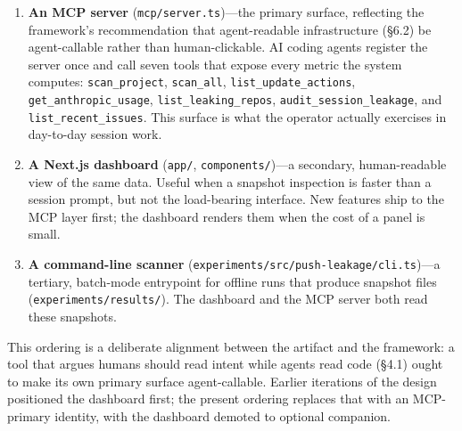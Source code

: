 \documentclass[12pt]{article}
\begin{document}
\begin{enumerate}
  \item \textbf{An MCP server} (\texttt{mcp/server.ts})---the primary surface, reflecting the framework's recommendation that agent-readable infrastructure (\S6.2) be agent-callable rather than human-clickable. AI coding agents register the server once and call seven tools that expose every metric the system computes: \texttt{scan\_project}, \texttt{scan\_all}, \texttt{list\_update\_actions}, \texttt{get\_anthropic\_usage}, \texttt{list\_leaking\_repos}, \texttt{audit\_session\_leakage}, and \texttt{list\_recent\_issues}. This surface is what the operator actually exercises in day-to-day session work.
  \item \textbf{A Next.js dashboard} (\texttt{app/}, \texttt{components/})---a secondary, human-readable view of the same data. Useful when a snapshot inspection is faster than a session prompt, but not the load-bearing interface. New features ship to the MCP layer first; the dashboard renders them when the cost of a panel is small.
  \item \textbf{A command-line scanner} (\texttt{experiments/src/push-leakage/cli.ts})---a tertiary, batch-mode entrypoint for offline runs that produce snapshot files (\texttt{experiments/results/}). The dashboard and the MCP server both read these snapshots.
\end{enumerate}

This ordering is a deliberate alignment between the artifact and the framework: a tool that argues humans should read intent while agents read code (\S4.1) ought to make its own primary surface agent-callable. Earlier iterations of the design positioned the dashboard first; the present ordering replaces that with an MCP-primary identity, with the dashboard demoted to optional companion.
\end{document}
